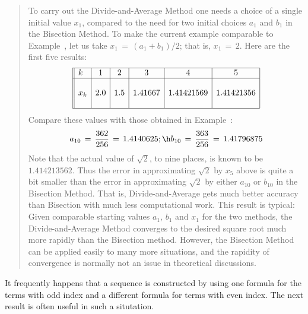 \begin{quotation}
{        To carry out the Divide-and-Average Method one needs a choice of a single initial value $x_{1}$,
    compared to the need for two initial choices $a_{1}$ and $b_{1}$ in the Bisection Method.
    To make the current example comparable to Example~, let us take $x_{1} \,=\, (a_{1}+b_{1})/2$; that is, $x_{1} \,=\, 2$.
    Here are the first five results:
        \begin{displaymath}
        \begin{array}{||l|c|c|c|c|c|c||} \hline
        k & 1   & 2   & 3       & 4          & 5          \\ \hline
          &     &     &         &            &            \\ 
    x_{k} & 2.0 & 1.5 & 1.41667 & 1.41421569 & 1.41421356 \\
          &     &     &         &            &            \\ \hline
        \end{array}
        \end{displaymath}
    Compare these values with those obtained in Example~:
        \begin{displaymath}
        a_{10} \,=\, \frac{362}{256} \,=\, 1.4140625; \h
        b_{10} \,=\, \frac{363}{256} \,=\, 1.41796875
        \end{displaymath}
    Note that the actual value of $\sqrt{2}$, to nine places, is known to be $1.414213562$.
    Thus the error in approximating $\sqrt{2}$ by $x_{5}$ above is quite a bit smaller
    than the error in approximating $\sqrt{2}$ by either $a_{10}$ or $b_{10}$ in the Bisection Method.
    That is, Divide-and-Average gets much better accuracy than Bisection with much less computational work.
    This result is typical: Given comparable starting values $a_{1}$, $b_{1}$ and $x_{1}$ for the two methods, the Divide-and-Average Method converges to the desired square root much more rapidly than the Bisection method.
    However, the Bisection Method can be applied easily to many more situations, and the rapidity of convergence is normally not an issue in theoretical discussions.
}%
\end{quotation} 

\VV



        It frequently happens that a sequence is constructed by using one formula for the terms with odd index and a different formula for terms with even index.
    The next result is often useful in such a situtation.

